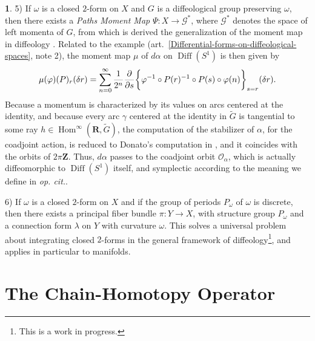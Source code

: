 \documentclass[11pt,reqno]{amsart}
\theoremstyle{definition}
\newtheorem{article}{}
\renewcommand{\over}{\above .2pt}
\newcommand{\RR}{{\mathbf R}}
\newcommand{\ZZ}{{\mathbf Z}}
\def \G{{G}}
\def \P{{P}}
\def \S{{S}}
\def \X{{X}}
\def \Y{{Y}}
\newcommand{\cG}{{\mathcal G}}
\newcommand{\cO}{{\mathcal O}}
\newcommand{\xart}[2]{{(art.~\ref{#1}, #2)}}
\newcommand{\Diff}{\operatorname{Diff}}
\newcommand{\DHom}{{\operatorname{Hom}}^\infty}
\begin{document}
\begin{article}
      5) If $\omega$ is a closed $2$-form on $\X$ and $\G$ is a diffeological group
      preserving $\omega$, then there exists
      a {\em Paths Moment Map} $\Psi : \X \to \cG^*$, where $\cG^*$ denotes
      the space of left momenta of $\G$, from which is derived the generalization
      of the moment map in diffeology \cite{Piz07}.
      Related to the example \xart{Differential-forms-on-diffeological-spaces}{note 2}, 
      the moment map $\mu$ of $d\alpha$ on $\Diff(\S^1)$ is then given by
      $$
      \mu(\varphi)(\P)_r(\delta r) = \sum_{n=0}^\infty {1 \over 2^n} 
      {\partial \over \partial s}\bigg\{\varphi^{-1} \circ \P(r)^{-1} 
      \circ \P(s) \circ \varphi (n)\bigg\}_{s=r} (\delta r).
      $$
      Because a momentum is characterized by its values on arcs centered at the identity, 
      and because every arc $\gamma$ centered at the identity in $\tilde \G$ is tangential
      to some ray $h \in \DHom(\RR,\tilde\G)$, the computation of the stabilizer of 
      $\alpha$, for the coadjoint action, is 
      reduced to Donato's computation in \cite{Don94}, 
      and it coincides with the orbits of $2\pi\ZZ$.  
      Thus, $d\alpha$ passes to the coadjoint orbit $\cO_\alpha$, 
      which is actually diffeomorphic to $\Diff(\S^1)$ itself, 
      and symplectic according to the meaning we define in {\em op. cit.}.
      
      6) If $\omega$ is a closed $2$-form on $\X$ and if the group of periods $\P_\omega$ of 
      $\omega$ is discrete, then there exists a principal fiber bundle 
      $\pi : \Y \to \X$, with structure group $\P_\omega$ and a connection form $\lambda$ on 
      $\Y$ with curvature $\omega$. This solves a universal problem about
      integrating closed $2$-forms in the general framework of diffeology\footnote{This is a work in progress.}, 
      and applies in particular to manifolds.
  \end{article} %
  
  
  \section{The Chain-Homotopy Operator}
  \label{Section-Chain-Homotopy-Operator}
  
\end{document}
